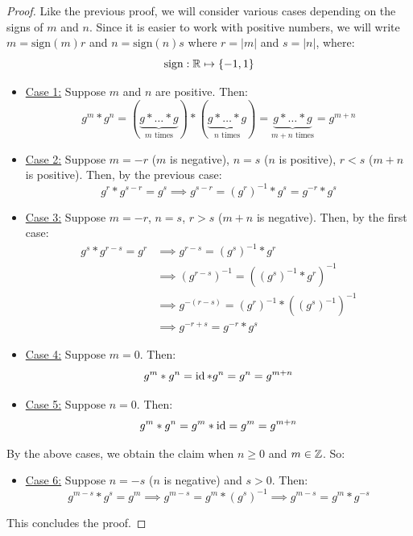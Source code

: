 \documentclass[letterpaper]{article}
\begin{document}
\begin{mdframed}
    \begin{proof}
        Like the previous proof, we will consider various cases depending on the signs of $m$ and $n$. Since it is easier to work with positive numbers, we will write $m = \text{sign}(m) r$ and $n = \text{sign}(n) s$ where $r = |m|$ and $s = |n|$, where: 
        \[\text{sign}: \mathbb{R} \mapsto \{-1, 1\}\]
        \begin{itemize}
            \item \underline{Case 1:} Suppose $m$ and $n$ are positive. Then: 
            \[g^m * g^n = (\underbrace{g * \dots * g}_{m \text{ times}}) * (\underbrace{g * \dots * g}_{n \text{ times}}) = \underbrace{g * \dots * g}_{m + n \text{ times}} = g^{m + n}\]
    
            \item \underline{Case 2:} Suppose $m = -r$ ($m$ is negative), $n = s$ ($n$ is positive), $r < s$ ($m + n$ is positive). Then, by the previous case:
            \[g^r * g^{s - r} = g^s \implies g^{s - r} = (g^r)^{-1} * g^s = g^{-r} * g^s\]  
    
            \item \underline{Case 3:} Suppose $m = -r$, $n = s$, $r > s$ ($m + n$ is negative). Then, by the first case: 
            \begin{equation*}
                \begin{aligned}
                    g^s * g^{r - s} = g^r &\implies g^{r - s} = (g^s)^{-1} * g^r \\ 
                        &\implies (g^{r - s})^{-1} = ((g^s)^{-1} * g^r)^{-1} \\ 
                        &\implies g^{-(r - s)} = (g^r)^{-1} * ((g^s)^{-1})^{-1} \\ 
                        &\implies g^{-r + s} = g^{-r} * g^s
                \end{aligned}
            \end{equation*}
    
            \item \underline{Case 4:} Suppose $m = 0$. Then: 
            \[g^m * g^n  = \operatorname{id} * g^n = g^n = g^{m + n}\]
    
            \item \underline{Case 5:} Suppose $n = 0$. Then: 
            \[g^m * g^n = g^m * \operatorname{id} = g^m = g^{m + n}\]
        \end{itemize}
        By the above cases, we obtain the claim when $n \geq 0$ and $m \in \mathbb{Z}$. So: 
        \begin{itemize}
            \item \underline{Case 6:} Suppose $n = -s$ ($n$ is negative) and $s > 0$. Then: 
            \[g^{m - s} * g^s = g^m \implies g^{m - s} = g^m * (g^s)^{-1} \implies g^{m - s} = g^m * g^{-s}\]
        \end{itemize}
        This concludes the proof. 
    \end{proof}
\end{mdframed}
\end{document}
